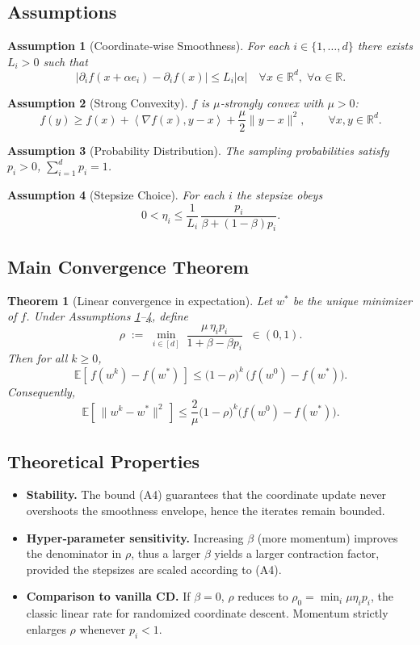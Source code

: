 \documentclass[11pt]{article}
\newtheorem{theorem}{Theorem}
\newtheorem{assumption}{Assumption}
\newcommand{\E}{\mathbb{E}}
\newcommand{\R}{\mathbb{R}}
\newcommand{\ip}[2]{\left\langle #1,#2 \right\rangle}
\begin{document}
\subsection*{Assumptions}
\begin{assumption}[Coordinate‑wise Smoothness]\label{as:smooth}
For each $i\in\{1,\dots,d\}$ there exists $L_i>0$ such that
\[
\bigl| \partial_i f(x+ \alpha e_i)-\partial_i f(x) \bigr|
\le L_i|\alpha|
\quad\forall x\in\R^{d},\;\forall \alpha\in\R .
\tag{A1}
\]
\end{assumption}
\begin{assumption}[Strong Convexity]\label{as:strong}
$f$ is $\mu$‑strongly convex with $\mu>0$:
\[
f(y)\ge f(x)+\ip{\nabla f(x)}{y-x}+\frac{\mu}{2}\|y-x\|^{2},
\qquad\forall x,y\in\R^{d}. \tag{A2}
\]
\end{assumption}
\begin{assumption}[Probability Distribution]\label{as:prob}
The sampling probabilities satisfy $p_i>0$, $\sum_{i=1}^{d}p_i=1$.
\end{assumption}
\begin{assumption}[Stepsize Choice]\label{as:stepsize}
For each $i$ the stepsize obeys
\[
0<\eta_i \le \frac{1}{L_i}\, \frac{p_i}{\beta + (1-\beta)p_i}.
\tag{A4}
\]
\end{assumption}

\subsection*{Main Convergence Theorem}
\begin{theorem}[Linear convergence in expectation]\label{thm:linear}
Let $w^*$ be the unique minimizer of $f$. Under Assumptions
\ref{as:smooth}–\ref{as:stepsize},
define
\[
\rho \;:=\; \min_{i\in[d]}\;
\frac{\mu\,\eta_i p_i}{1+\beta -\beta p_i}\;\; \in (0,1).
\]
Then for all $k\ge 0$,
\[
\E\!\left[\,f(w^{k})-f(w^{*})\,\right]\le
\bigl(1-\rho\bigr)^{k}\,
\bigl(f(w^{0})-f(w^{*})\bigr). \tag{5}
\]
Consequently,
\[
\E\!\left[\,\|w^{k}-w^{*}\|^{2}\,\right]\le
\frac{2}{\mu}\bigl(1-\rho\bigr)^{k}
\bigl(f(w^{0})-f(w^{*})\bigr). \tag{6}
\]
\end{theorem}

\subsection*{Theoretical Properties}
\begin{itemize}
\item \textbf{Stability.} The bound (A4) guarantees that the
coordinate update never overshoots the smoothness envelope,
hence the iterates remain bounded.
\item \textbf{Hyper‑parameter sensitivity.}
Increasing $\beta$ (more momentum) improves the denominator in $\rho$,
thus a larger $\beta$ yields a larger contraction factor,
provided the stepsizes are scaled according to (A4).
\item \textbf{Comparison to vanilla CD.}
If $\beta=0$, $\rho$ reduces to
$\displaystyle\rho_{0}= \min_i \mu\eta_i p_i$,
the classic linear rate for randomized coordinate descent.
Momentum strictly enlarges $\rho$ whenever $p_i<1$.
\end{itemize}
\end{document}

